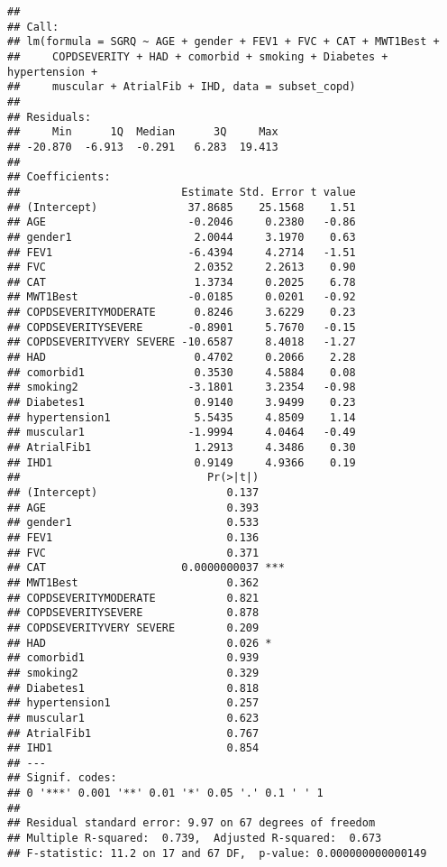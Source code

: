 \documentclass[
]{article}
\begin{document}
\begin{verbatim}
## 
## Call:
## lm(formula = SGRQ ~ AGE + gender + FEV1 + FVC + CAT + MWT1Best + 
##     COPDSEVERITY + HAD + comorbid + smoking + Diabetes + hypertension + 
##     muscular + AtrialFib + IHD, data = subset_copd)
## 
## Residuals:
##     Min      1Q  Median      3Q     Max 
## -20.870  -6.913  -0.291   6.283  19.413 
## 
## Coefficients:
##                         Estimate Std. Error t value
## (Intercept)              37.8685    25.1568    1.51
## AGE                      -0.2046     0.2380   -0.86
## gender1                   2.0044     3.1970    0.63
## FEV1                     -6.4394     4.2714   -1.51
## FVC                       2.0352     2.2613    0.90
## CAT                       1.3734     0.2025    6.78
## MWT1Best                 -0.0185     0.0201   -0.92
## COPDSEVERITYMODERATE      0.8246     3.6229    0.23
## COPDSEVERITYSEVERE       -0.8901     5.7670   -0.15
## COPDSEVERITYVERY SEVERE -10.6587     8.4018   -1.27
## HAD                       0.4702     0.2066    2.28
## comorbid1                 0.3530     4.5884    0.08
## smoking2                 -3.1801     3.2354   -0.98
## Diabetes1                 0.9140     3.9499    0.23
## hypertension1             5.5435     4.8509    1.14
## muscular1                -1.9994     4.0464   -0.49
## AtrialFib1                1.2913     4.3486    0.30
## IHD1                      0.9149     4.9366    0.19
##                             Pr(>|t|)    
## (Intercept)                    0.137    
## AGE                            0.393    
## gender1                        0.533    
## FEV1                           0.136    
## FVC                            0.371    
## CAT                     0.0000000037 ***
## MWT1Best                       0.362    
## COPDSEVERITYMODERATE           0.821    
## COPDSEVERITYSEVERE             0.878    
## COPDSEVERITYVERY SEVERE        0.209    
## HAD                            0.026 *  
## comorbid1                      0.939    
## smoking2                       0.329    
## Diabetes1                      0.818    
## hypertension1                  0.257    
## muscular1                      0.623    
## AtrialFib1                     0.767    
## IHD1                           0.854    
## ---
## Signif. codes:  
## 0 '***' 0.001 '**' 0.01 '*' 0.05 '.' 0.1 ' ' 1
## 
## Residual standard error: 9.97 on 67 degrees of freedom
## Multiple R-squared:  0.739,  Adjusted R-squared:  0.673 
## F-statistic: 11.2 on 17 and 67 DF,  p-value: 0.000000000000149
\end{verbatim}
\end{document}
